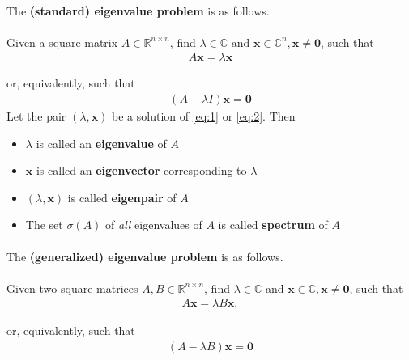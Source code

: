\paragraph*{}
The \textbf{(standard) eigenvalue problem} is as follows.
\paragraph*{}
Given a square matrix $A \in \mathbb{R}^{n\times n}$, find $\lambda \in \mathbb{C} \text{ and } \mathbf{x} \in \mathbb{C}^n, \mathbf{x} \neq \mathbf{0}$, such that
\begin{align}\label{eq:1}
    A\mathbf{x}=\lambda\mathbf{x}
\end{align}

or, equivalently, such that 
\begin{align}\label{eq:2}
    (A-\lambda I)\mathbf{x} = \mathbf{0}
\end{align}
Let the pair $(\lambda, \mathbf{x})$ be a solution of \eqref{eq:1} or \eqref{eq:2}. Then 
\begin{itemize}
    \item $\lambda$ is called an \textbf{eigenvalue} of $A$
    \item $\textbf{x}$ is called an \textbf{eigenvector} corresponding to $\lambda$
    \item $(\lambda,\mathbf{x})$ is called \textbf{eigenpair} of $A$
    \item The set $\sigma(A)$  of \textit{all} eigenvalues of $A$ is called \textbf{spectrum} of $A$
\end{itemize}
\paragraph*{}
The \textbf{(generalized) eigenvalue problem} is as follows.

\paragraph*{}
Given two square matrices $A,B \in \mathbb{R}^{n\times n}$, find $\lambda \in \mathbb{C}$ and $\mathbf{x} \in \mathbb{C}, \mathbf{x} \neq \mathbf{0}$, such that
\begin{align}
    A\mathbf{x}=\lambda B \mathbf{x},
\end{align}

or, equivalently, such that 
\begin{align}
    (A-\lambda B)\mathbf{x} = \mathbf{0}
\end{align}

